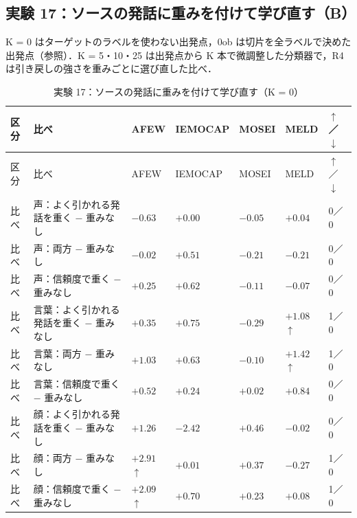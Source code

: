 \subsection*{実験 17：ソースの発話に重みを付けて学び直す（B）}
K = 0 はターゲットのラベルを使わない出発点，0ob は切片を全ラベルで決めた出発点（参照）．K = 5・10・25 は出発点から K 本で微調整した分類器で，R4 は引き戻しの強さを重みごとに選び直した比べ．\par
\begin{longtable}{>{\raggedright}p{0.75cm}>{\raggedright}p{5.6cm}>{\raggedright}p{2.05cm}>{\raggedright}p{2.05cm}>{\raggedright}p{2.05cm}>{\raggedright}p{2.05cm}p{0.75cm}}
\caption{実験 17：ソースの発話に重みを付けて学び直す（K = 0）}\\
\toprule
区分 & 比べ & AFEW & IEMOCAP & MOSEI & MELD & $\uparrow$／$\downarrow$ \\
\midrule
\endfirsthead
\toprule
区分 & 比べ & AFEW & IEMOCAP & MOSEI & MELD & $\uparrow$／$\downarrow$ \\
\midrule
\endhead
\bottomrule
\endfoot

比べ & 声：よく引かれる発話を重く $-$ 重みなし & $-0.63$ & $+0.00$ & $-0.05$ & $+0.04$ & 0／0 \\
比べ & 声：両方 $-$ 重みなし & $-0.02$ & $+0.51$ & $-0.21$ & $-0.21$ & 0／0 \\
比べ & 声：信頼度で重く $-$ 重みなし & $+0.25$ & $+0.62$ & $-0.11$ & $-0.07$ & 0／0 \\
比べ & 言葉：よく引かれる発話を重く $-$ 重みなし & $+0.35$ & $+0.75$ & $-0.29$ & $+1.08$$\uparrow$ & 1／0 \\
比べ & 言葉：両方 $-$ 重みなし & $+1.03$ & $+0.63$ & $-0.10$ & $+1.42$$\uparrow$ & 1／0 \\
比べ & 言葉：信頼度で重く $-$ 重みなし & $+0.52$ & $+0.24$ & $+0.02$ & $+0.84$ & 0／0 \\
比べ & 顔：よく引かれる発話を重く $-$ 重みなし & $+1.26$ & $-2.42$ & $+0.46$ & $-0.02$ & 0／0 \\
比べ & 顔：両方 $-$ 重みなし & $+2.91$$\uparrow$ & $+0.01$ & $+0.37$ & $-0.27$ & 1／0 \\
比べ & 顔：信頼度で重く $-$ 重みなし & $+2.09$$\uparrow$ & $+0.70$ & $+0.23$ & $+0.08$ & 1／0 \\
\end{longtable}
